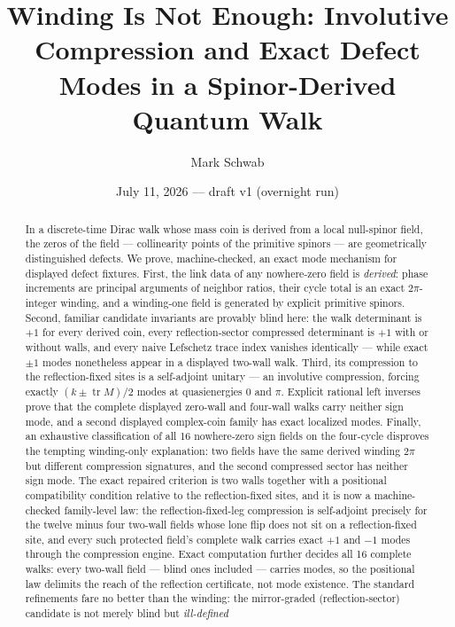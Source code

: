 \documentclass[11pt]{article}
\title{Winding Is Not Enough: Involutive Compression and Exact Defect
Modes in a Spinor-Derived Quantum Walk}
\author{Mark Schwab}
\date{July 11, 2026 --- draft v1 (overnight run)}
\newcommand{\tr}{\operatorname{tr}}
\begin{document}
\maketitle

\begin{abstract}
In a discrete-time Dirac walk whose mass coin is derived from a local
null-spinor field, the zeros of the field --- collinearity points of the
primitive spinors --- are geometrically distinguished defects.  We prove,
machine-checked, an exact mode mechanism for displayed defect fixtures.
First, the link data of any nowhere-zero field is \emph{derived}: phase
increments are principal arguments of neighbor ratios, their cycle total is
an exact $2\pi$-integer winding, and a winding-one field is generated by
explicit primitive spinors.  Second, familiar candidate invariants are
provably blind here: the walk determinant is $+1$ for every derived coin,
every reflection-sector compressed determinant is $+1$ with or without
walls, and every naive Lefschetz trace index vanishes identically ---
while exact $\pm1$ modes nonetheless appear in a displayed two-wall walk.
Third, its compression to the reflection-fixed sites is a self-adjoint
unitary --- an involutive compression, forcing exactly
$(k\pm\tr M)/2$ modes at quasienergies $0$ and $\pi$.  Explicit rational
left inverses prove that the complete displayed zero-wall and four-wall
walks carry neither sign mode, and a second displayed complex-coin family
has exact localized modes.  Finally, an exhaustive classification of all
16 nowhere-zero sign fields on the four-cycle disproves the tempting
winding-only explanation: two fields have the same derived winding $2\pi$
but different compression signatures, and the second compressed sector has
neither sign mode.  The exact repaired criterion is two walls together with
a positional compatibility condition relative to the reflection-fixed
sites, and it is now a machine-checked family-level law: the
reflection-fixed-leg compression is self-adjoint precisely for the twelve
minus four two-wall fields whose lone flip does not sit on a
reflection-fixed site, and every such protected field's complete walk
carries exact $+1$ and $-1$ modes through the compression engine.  Exact
computation further decides all 16 complete walks: every two-wall field
--- blind ones included --- carries modes, so the positional law
delimits the reach of the reflection certificate, not mode existence.
The standard refinements fare no better than the winding: the mirror-graded
(reflection-sector) candidate is not merely blind but \emph{ill-defined}

\end{abstract}
\end{document}

